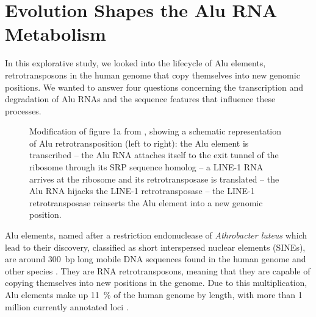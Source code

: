 
\chapter{Evolution Shapes the Alu RNA Metabolism}

In this explorative study, we looked into the lifecycle of Alu elements,
retrotransposons in the human genome that copy themselves into new genomic
positions. We wanted to answer four questions concerning the transcription
and degradation of Alu RNAs and the sequence features that influence these
processes.

\begin{figure}[b!]
\centering
\caption{Modification of figure 1a from \citet{Baar2022}, showing a schematic
  representation of Alu retrotransposition (left to right): the Alu element
  is transcribed -- the Alu RNA attaches itself to the exit tunnel of the
  ribosome through its SRP sequence homolog -- a LINE-1 RNA arrives at the
  ribosome and its retrotransposase is translated -- the Alu RNA hijacks the
  LINE-1 retrotransposase -- the LINE-1 retrotransposase reinserts the Alu
  element into a new genomic position.}
\label{fig:alulife}
\end{figure}

Alu elements, named after a restriction endonuclease of \textit{Athrobacter
luteus} which lead to their discovery, classified as short interspersed
nuclear elements (SINEs), are around \num{300}~bp long mobile DNA sequences
found in the human genome and other species
\citep{Schmid1975,Quentin1992,Lander2001,JO2007,Deininger2011}. They are RNA
retrotransposons, meaning that they are capable of copying themselves into new
positions in the genome. Due to this multiplication, Alu elements make up
\SI{11}{\percent} of the human genome by length, with more than \num{1}
million currently annotated loci \citep{Lander2001}.

